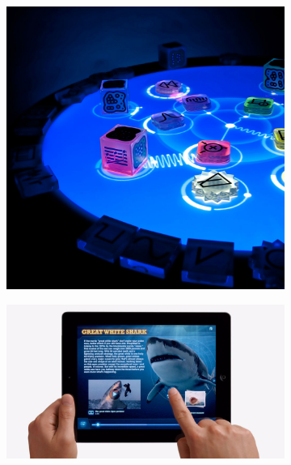 \begin{figure}[h]
  \centering
  \begin{subfigure}[b]{.3\textwidth}
    \centering
    \includegraphics[width=0.9\linewidth]{figures/touch/reactable}
    \label{sofa_interaction:reactable}
  \end{subfigure}%
  \hspace{0.2cm}
  \begin{subfigure}[b]{.3\textwidth}
    \centering
    \includegraphics[width=0.9\linewidth]{figures/touch/ipad}
    \label{sofa_interaction:ipad}
  \end{subfigure}
  \hspace{0.2cm}
  \begin{subfigure}[b]{.3\textwidth}

\end{subfigure}
\end{figure}
